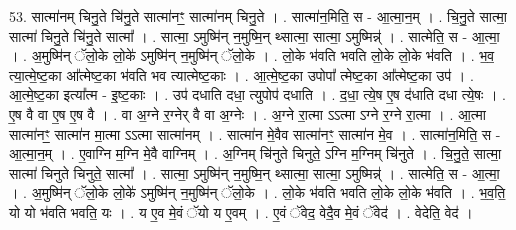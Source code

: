 \documentclass[17pt]{extarticle}
\begin{document}
53. सात्मा॑नम् चिनु॒ते चि॑नु॒ते सात्मा॑नꣳ॒॒ सात्मा॑नम् चिनु॒ते । . सात्मा॑न॒मिति॒ स - आ॒त्मा॒न॒म् । . चि॒नु॒ते सात्मा॒ सात्मा॑ चिनु॒ते चि॑नु॒ते सात्मा᳚ । . सात्मा॒ ऽमुष्मि॑न् न॒मुष्मि॒न् थ्सात्मा॒ सात्मा॒ ऽमुष्मिन्न्॑ । . सात्मेति॒ स - आ॒त्मा॒ । . अ॒मुष्मि॑न् ॅलो॒के लो॒के॑ ऽमुष्मि॑न् न॒मुष्मि॑न् ॅलो॒के । . लो॒के भ॑वति भवति लो॒के लो॒के भ॑वति । . भ॒व॒ त्या॒त्मे॒ष्ट॒का आ᳚त्मेष्ट॒का भ॑वति भव त्यात्मेष्ट॒काः । . आ॒त्मे॒ष्ट॒का उपोपा᳚ त्मेष्ट॒का आ᳚त्मेष्ट॒का उप॑ । . आ॒त्मे॒ष्ट॒का इत्या᳚त्म - इ॒ष्ट॒काः । . उप॑ दधाति दधा॒ त्युपोप॑ दधाति । . द॒धा॒ त्ये॒ष ए॒ष द॑धाति दधा त्ये॒षः । . ए॒ष वै वा ए॒ष ए॒ष वै । . वा अ॒ग्ने र॒ग्नेर् वै वा अ॒ग्नेः । . अ॒ग्ने रा॒त्मा ऽऽत्मा ऽग्ने र॒ग्ने रा॒त्मा । . आ॒त्मा सात्मा॑नꣳ॒॒ सात्मा॑न मा॒त्मा ऽऽत्मा सात्मा॑नम् । . सात्मा॑न मे॒वैव सात्मा॑नꣳ॒॒ सात्मा॑न मे॒व । . सात्मा॑न॒मिति॒ स - आ॒त्मा॒न॒म् । . ए॒वाग्नि म॒ग्नि मे॒वै वाग्निम् । . अ॒ग्निम् चि॑नुते चिनुते॒ ऽग्नि म॒ग्निम् चि॑नुते । . चि॒नु॒ते॒ सात्मा॒ सात्मा॑ चिनुते चिनुते॒ सात्मा᳚ । . सात्मा॒ ऽमुष्मि॑न् न॒मुष्मि॒न् थ्सात्मा॒ सात्मा॒ ऽमुष्मिन्न्॑ । . सात्मेति॒ स - आ॒त्मा॒ । . अ॒मुष्मि॑न् ॅलो॒के लो॒के॑ ऽमुष्मि॑न् न॒मुष्मि॑न् ॅलो॒के । . लो॒के भ॑वति भवति लो॒के लो॒के भ॑वति । . भ॒व॒ति॒ यो यो भ॑वति भवति॒ यः । . य ए॒व मे॒वं ॅयो य ए॒वम् । . ए॒वं ॅवेद॒ वेदै॒व मे॒वं ॅवेद॑ । . वेदेति॒ वेद॑ । \newline
\end{document}
